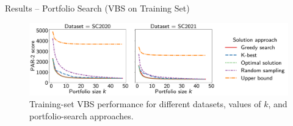 \documentclass[en]{sdqbeamer}
\begin{document}
\begin{frame}[t]{Results -- Portfolio Search (VBS on Training Set)}
	\begin{figure}[htb]
		\centering
		\includegraphics[width=\textwidth]{plots/search-train-objective.pdf}
		\caption*{Training-set VBS performance for different datasets, values of $k$, and portfolio-search approaches.}
	\end{figure}
\end{frame}
\end{document}
